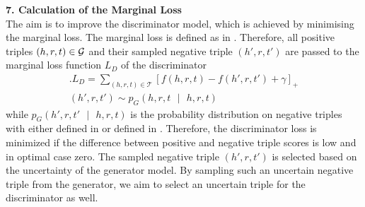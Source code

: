 \textbf{7. Calculation of the Marginal Loss}\\
%
The aim is to improve the discriminator model, which is achieved by minimising the marginal loss.
The marginal loss is defined as in .
Therefore, all positive triples $(h,r,t) \in \mathcal{G}$ and their sampled negative triple $(h',r, t')$  are passed to the marginal loss function $L_D$ of the discriminator
\begin{multline} \label{eq:marginalloss2}.
    L_D =\sum_{(h,r,t) \in \mathcal{T}}[f(h,r,t) - f(h',r,t')+\gamma]_+\\
    (h',r,t') \sim p_G(h,r,t\text{ }|\text{ }h,r,t) 
\end{multline}
while $p_G(h', r, t'\text{ }|\text{ }h, r, t)$ is the probability distribution on negative triples with either \usmax defined in  or \ussoftmax defined in .
Therefore, the discriminator loss is minimized if the difference between positive and negative triple scores is low and in optimal case zero.
The sampled negative triple $(h',r,t')$ is selected based on the uncertainty of the generator model.
By sampling such an uncertain negative triple from the generator, we aim to select an uncertain triple for the discriminator as well.